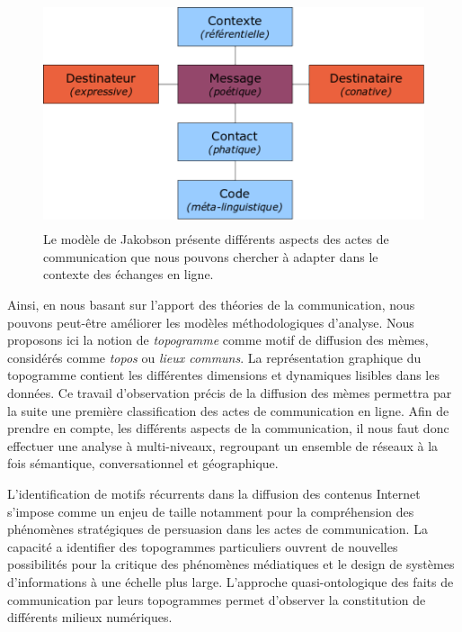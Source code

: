 \begin{figure}[htpb]
    \centering

    \includegraphics[width=4.6894in,height=2.6114in]{figures/chap3/chapitre3-img5.png}

    \caption[Modèle de Jakobson]{ Le modèle de Jakobson présente différents aspects des actes de communication que nous pouvons chercher à adapter dans le contexte des échanges en ligne.}
    \label{fig:jakobson}

\end{figure}

Ainsi, en nous basant sur l'apport des théories de la communication, nous pouvons peut-\^etre améliorer les modèles méthodologiques d{\textquoteright}analyse. Nous proposons ici la notion de \textit{topogramme} comme motif de diffusion des mèmes, considérés comme \textit{topos} ou \textit{lieux communs}. La représentation graphique du topogramme contient les différentes dimensions et dynamiques lisibles dans les données. Ce travail d'observation précis de la diffusion des mèmes permettra par la suite une première classification des actes de communication en ligne. Afin de prendre en compte, les différents aspects de la communication, il nous faut donc effectuer une analyse à multi-niveaux, regroupant un ensemble de réseaux à la fois sémantique, conversationnel et géographique.

L’identification de motifs récurrents dans la diffusion des contenus Internet s'impose comme un enjeu de taille notamment pour la compréhension des phénomènes stratégiques de persuasion dans les actes de communication. La capacité a identifier des topogrammes particuliers ouvrent de nouvelles possibilités pour la critique des phénomènes médiatiques et le design de systèmes d’informations à une échelle plus large. L'approche quasi-ontologique des faits de communication par leurs topogrammes  permet d'observer la constitution de différents milieux numériques.
